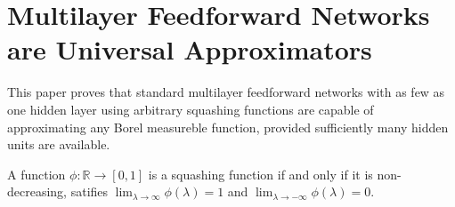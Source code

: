 \section{Multilayer Feedforward Networks are Universal Approximators}
This paper\cite{hornik_1989} proves that standard multilayer feedforward networks with as few as one hidden 
layer using arbitrary squashing functions are capable of approximating any Borel measureble function, provided
sufficiently many hidden units are available.

\begin{df}
    A function $\phi: \mathbb{R}\longrightarrow [0, 1]$ is a squashing function if and only if it is non-decreasing, 
    satifies $\lim_{\lambda \to \infty}\phi(\lambda) = 1$ and $\lim_{\lambda \to -\infty}\phi(\lambda) = 0$.
\end{df}
